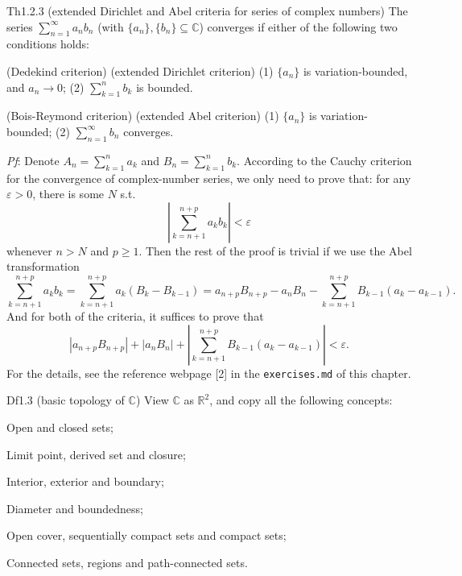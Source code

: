 \documentclass{article}
\begin{document}
\begin{Th}{Th1.2.3 (extended Dirichlet and Abel criteria for series of complex numbers)}
    The series $\sum_{n=1}^{\infty} a_nb_n$ (with $\{a_n\}, \{b_n\}\subseteq\mathbb{C}$) converges if either of the following two conditions holds:
    \begin{compactenum}
        \item (Dedekind criterion) (extended Dirichlet criterion) 
            \subitem (1) $\{a_n\}$ is variation-bounded, and $a_n\to 0$;
            \subitem (2) $\sum_{k=1}^{n} b_k$ is bounded.
        \item (Bois-Reymond criterion) (extended Abel criterion)
            \subitem (1) $\{a_n\}$ is variation-bounded;
            \subitem (2) $\sum_{n=1}^{\infty} b_n$ converges.
    \end{compactenum}
    \tcblower
    \textit{Pf}: Denote $A_n = \sum_{k=1}^{n} a_k$ and $B_n = \sum_{k=1}^{n} b_k$. According to the Cauchy criterion for the convergence of complex-number series, we only need to prove that: for any $\varepsilon>0$, there is some $N$ s.t. 
    $$ \left| \sum_{k=n+1}^{n+p} a_kb_k \right| < \varepsilon $$
    whenever $n>N$ and $p\geq 1$. Then the rest of the proof is trivial if we use the Abel transformation
    $$ \sum_{k=n+1}^{n+p} a_kb_k = \sum_{k=n+1}^{n+p} a_k (B_k-B_{k-1}) = a_{n+p}B_{n+p} - a_nB_n - \sum_{k=n+1}^{n+p} B_{k-1}(a_k-a_{k-1}). $$
    And for both of the criteria, it suffices to prove that
    $$ \left| a_{n+p}B_{n+p} \right| + \left| a_nB_n \right| + \left| \sum_{k=n+1}^{n+p} B_{k-1}(a_k-a_{k-1}) \right| < \varepsilon. $$
    For the details, see the reference webpage [2] in the \verb|exercises.md| of this chapter.
\end{Th}

\begin{Df}{Df1.3 (basic topology of $\mathbb{C}$)}
    View $\mathbb{C}$ as $\mathbb{R}^2$, and copy all the following concepts:
    \begin{compactenum}
        \item Open and closed sets;
        \item Limit point, derived set and closure;
        \item Interior, exterior and boundary;
        \item Diameter and boundedness;
        \item Open cover, sequentially compact sets and compact sets;
        \item Connected sets, regions and path-connected sets.
    \end{compactenum}
\end{Df}
\end{document}
